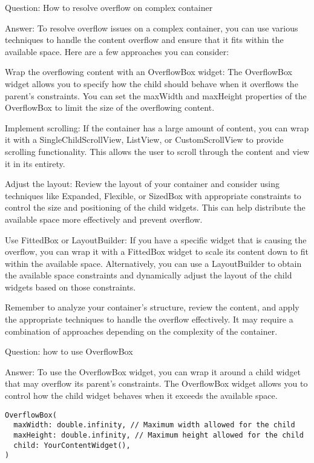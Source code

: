 Question: How to resolve overflow on complex container

Answer: To resolve overflow issues on a complex container, you can use various techniques to handle the content 
overflow and ensure that it fits within the available space. Here are a few approaches you can consider:

Wrap the overflowing content with an OverflowBox widget: The OverflowBox widget allows you to specify how the 
child should behave when it overflows the parent's constraints. You can set the maxWidth and maxHeight properties 
of the OverflowBox to limit the size of the overflowing content.

Implement scrolling: If the container has a large amount of content, you can wrap it with a SingleChildScrollView, 
ListView, or CustomScrollView to provide scrolling functionality. This allows the user to scroll through the content 
and view it in its entirety.

Adjust the layout: Review the layout of your container and consider using techniques like Expanded, Flexible, or 
SizedBox with appropriate constraints to control the size and positioning of the child widgets. This can help 
distribute the available space more effectively and prevent overflow.

Use FittedBox or LayoutBuilder: If you have a specific widget that is causing the overflow, you can wrap it with a 
FittedBox widget to scale its content down to fit within the available space. Alternatively, you can use a 
LayoutBuilder to obtain the available space constraints and dynamically adjust the layout of the child widgets 
based on those constraints.

Remember to analyze your container's structure, review the content, and apply the appropriate techniques to handle 
the overflow effectively. It may require a combination of approaches depending on the complexity of the container.

Question: how to use OverflowBox 

Answer: To use the OverflowBox widget, you can wrap it around a child widget that may overflow its parent's constraints. 
The OverflowBox widget allows you to control how the child widget behaves when it exceeds the available space.

\begin{lstlisting}
OverflowBox(
  maxWidth: double.infinity, // Maximum width allowed for the child
  maxHeight: double.infinity, // Maximum height allowed for the child
  child: YourContentWidget(),
)
\end{lstlisting}

